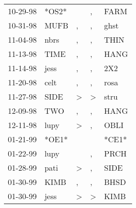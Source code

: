\begin{supertabular}{p{0.07\textwidth}p{0.06\textwidth}p{0.02\textwidth}p{0.02\textwidth}p{0.06\textwidth}}
          10-29-98\textsuperscript{} &                            *OS2* &                  &                , &           FARM\textsuperscript{} \\
          10-31-98\textsuperscript{} &           MUFB\textsuperscript{} &                , &                , &           ghst\textsuperscript{} \\
          11-04-98\textsuperscript{} &           nbrs\textsuperscript{} &                , &                , &           THIN\textsuperscript{} \\
          11-13-98\textsuperscript{} &           TIME\textsuperscript{} &                , &                , &           HANG\textsuperscript{} \\
          11-14-98\textsuperscript{} &           jess\textsuperscript{} &                , &                , &            2X2\textsuperscript{} \\
          11-20-98\textsuperscript{} &           celt\textsuperscript{} &                , &                , &           rosa\textsuperscript{} \\
          11-27-98\textsuperscript{} &           SIDE\textsuperscript{} &     \textgreater &     \textgreater &           stru\textsuperscript{} \\
          12-09-98\textsuperscript{} &            TWO\textsuperscript{} &                , &                , &           HANG\textsuperscript{} \\
          12-11-98\textsuperscript{} &           lupy\textsuperscript{} &     \textgreater &                , &           OBLI\textsuperscript{} \\
          01-21-99\textsuperscript{} &                            *OE1* &                  &                  &                            *CE1* \\
          01-22-99\textsuperscript{} &           lupy\textsuperscript{} &                  &                , &           PRCH\textsuperscript{} \\
          01-28-99\textsuperscript{} &           pati\textsuperscript{} &     \textgreater &                , &           SIDE\textsuperscript{} \\
          01-30-99\textsuperscript{} &           KIMB\textsuperscript{} &                , &                , &           BHSD\textsuperscript{} \\
          01-30-99\textsuperscript{} &           jess\textsuperscript{} &     \textgreater &     \textgreater &           KIMB\textsuperscript{} \\

\end{supertabular}
